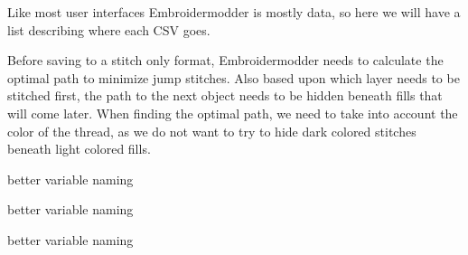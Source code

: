 \begin{DoxyRefList}
\label{todo__todo000037}%
%
Like most user interfaces Embroidermodder is mostly data, so here we will have a list describing where each CSV goes. 
\item[Global \mbox{\hyperlink{class_save_object_a15bdf578a20c1c1cb630dc8264448484}{Save\+Object\+::save}} (const QString \&file\+Name)]\label{todo__todo000002}%
%
Before saving to a stitch only format, Embroidermodder needs to calculate the optimal path to minimize jump stitches. Also based upon which layer needs to be stitched first, the path to the next object needs to be hidden beneath fills that will come later. When finding the optimal path, we need to take into account the color of the thread, as we do not want to try to hide dark colored stitches beneath light colored fills.  
\item[Global \mbox{\hyperlink{struct_sub_descriptor___affb2c75b7f632338f368aafab49f678d}{Sub\+Descriptor\+\_\+\+::color\+Code}} ]\label{todo__todo000012}%
%
better variable naming  
\item[Global \mbox{\hyperlink{struct_sub_descriptor___a0cfe04519ff6dab092ee7c002e55e520}{Sub\+Descriptor\+\_\+\+::some\+Int}} ]\label{todo__todo000010}%
%
better variable naming  
\item[Global \mbox{\hyperlink{struct_sub_descriptor___a6154b0f4ec7815c6d26c71852506418e}{Sub\+Descriptor\+\_\+\+::some\+Other\+Int}} ]\label{todo__todo000011}%
%
better variable naming 
\end{DoxyRefList}